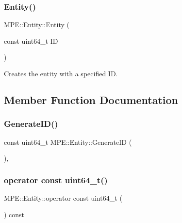 \subsubsection{\texorpdfstring{Entity()}{Entity()}\hspace{0.1cm}{\footnotesize\ttfamily [2/2]}}
{\footnotesize\ttfamily M\+P\+E\+::\+Entity\+::\+Entity (\begin{DoxyParamCaption}\item[{const uint64\+\_\+t}]{ID }\end{DoxyParamCaption})\hspace{0.3cm}{\ttfamily [inline]}}



Creates the entity with a specified ID. 



\subsection{Member Function Documentation}
\mbox{\label{struct_m_p_e_1_1_entity_a629768de1229b78f58ef62534fe74663}} 
\subsubsection{\texorpdfstring{Generate\+I\+D()}{GenerateID()}}
{\footnotesize\ttfamily const uint64\+\_\+t M\+P\+E\+::\+Entity\+::\+Generate\+ID (\begin{DoxyParamCaption}{ }\end{DoxyParamCaption})\hspace{0.3cm}{\ttfamily [static]}, {\ttfamily [private]}}

\mbox{\label{struct_m_p_e_1_1_entity_a985a1dae08ed4ab82e4a0ae2263cb4a7}} 
\subsubsection{\texorpdfstring{operator const uint64\+\_\+t()}{operator const uint64\_t()}}
{\footnotesize\ttfamily M\+P\+E\+::\+Entity\+::operator const uint64\+\_\+t (\begin{DoxyParamCaption}{ }\end{DoxyParamCaption}) const\hspace{0.3cm}{\ttfamily [inline]}}



